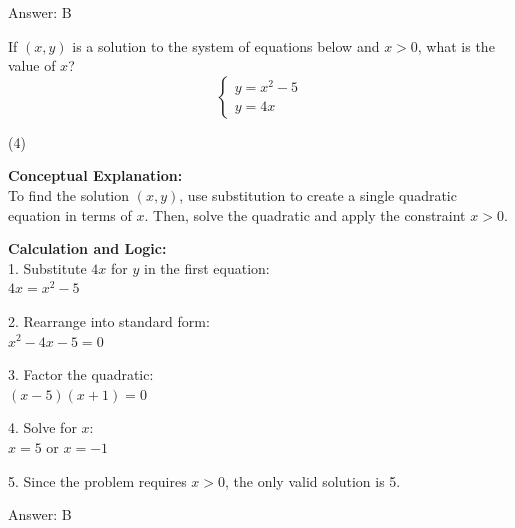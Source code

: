 \documentclass[11pt,paper=a4,answers]{exam}
\begin{document}
\begin{questions}
\begin{solution}
\vspace{25pt}

Answer: \colorbox{yellow!100}{B}
\end{solution}

\vspace{40pt}

\question
If $(x, y)$ is a solution to the system of equations below and $x > 0$, what is the value of $x$?
\[ \begin{cases} y = x^2 - 5 \\ y = 4x \end{cases} \]
\begin{tasks}(4)
\end{tasks}

\begin{solution}
\textbf{Conceptual Explanation:} \\
To find the solution $(x, y)$, use substitution to create a single quadratic equation in terms of $x$. Then, solve the quadratic and apply the constraint $x > 0$.

\vspace{20pt}

\textbf{Calculation and Logic:} \\
1. Substitute $4x$ for $y$ in the first equation: \\
   $4x = x^2 - 5$

\vspace{10pt}

2. Rearrange into standard form: \\
   $x^2 - 4x - 5 = 0$

\vspace{10pt}

3. Factor the quadratic: \\
   $(x - 5)(x + 1) = 0$

\vspace{10pt}

4. Solve for $x$: \\
   $x = 5$ or $x = -1$

\vspace{10pt}

5. Since the problem requires $x > 0$, the only valid solution is 5.

\vspace{25pt}

Answer: \colorbox{yellow!100}{B}
\end{solution}


\end{questions}
\end{document}
